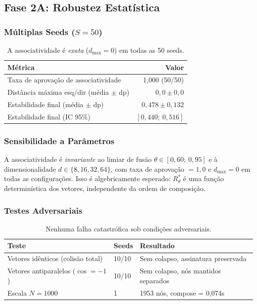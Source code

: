 \documentclass[11pt,a4paper]{article}
\theoremstyle{definition}
\begin{document}
\subsection{Fase 2A: Robustez Estat\'istica}

\subsubsection{M\'ultiplas Seeds ($S = 50$)}

\begin{table}[h]
\centering
\begin{tabular}{lr}
\toprule
\textbf{M\'etrica} & \textbf{Valor} \\
\midrule
Taxa de aprova\c{c}\~ao de associatividade & 1,000 (50/50) \\
Dist\^ancia m\'axima esq/dir (m\'edia $\pm$ dp) & $0{,}0 \pm 0{,}0$ \\
Estabilidade final (m\'edia $\pm$ dp) & $0{,}478 \pm 0{,}132$ \\
Estabilidade final (IC 95\%) & $[0{,}440;\ 0{,}516]$ \\
\bottomrule
\end{tabular}
\caption{A associatividade \'e \emph{exata} ($d_{\max} = 0$) em todas as 50 seeds.}
\end{table}

\subsubsection{Sensibilidade a Par\^ametros}

A associatividade \'e \emph{invariante} ao limiar de fus\~ao $\theta \in [0{,}60;\ 0{,}95]$ e \`a dimensionalidade $d \in \{8, 16, 32, 64\}$, com taxa de aprova\c{c}\~ao $= 1{,}0$ e $d_{\max} = 0$ em todas as configura\c{c}\~oes. Isso \'e algebricamente esperado: $R_\theta^*$ \'e uma fun\c{c}\~ao determin\'istica dos vetores, independente da ordem de composi\c{c}\~ao.

\subsubsection{Testes Adversariais}

\begin{table}[h]
\centering
\begin{tabular}{lll}
\toprule
\textbf{Teste} & \textbf{Seeds} & \textbf{Resultado} \\
\midrule
Vetores id\^enticos (colis\~ao total) & 10/10 & Sem colapso, assinatura preservada \\
Vetores antiparalelos ($\cos = -1$) & 10/10 & Sem colapso, n\'os mantidos separados \\
Escala $N = 1000$ & 1 & 1953 n\'os, compose = 0,074s \\
\bottomrule
\end{tabular}
\caption{Nenhuma falha catastr\'ofica sob condi\c{c}\~oes adversariais.}
\end{table}
\end{document}
